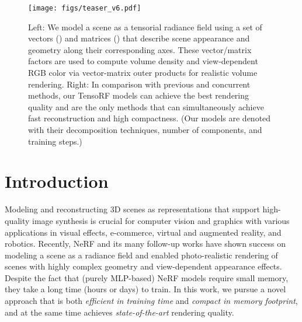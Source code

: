 \documentclass[runningheads]{llncs}
\begin{document}
\newcommand{\Tensor}{\mathcal{T}}
\newcommand{\Vector}{\mathbf{v}}
\newcommand{\Matrix}{\mathbf{M}}
\newcommand{\AppVec}{\mathbf{b}}
\newcommand{\AppMat}{\mathbf{B}}
\newcommand{\VectorPack}{\mathbf{V}}
\newcommand{\RRR}{\mathbb{R}}
\newcommand{\DimIJK}{I\times J\times K}
\newcommand{\DimCh}{P}


\newcommand{\OuterP}{\circ}
\newcommand{\ScalarP}{\ast}
\newcommand{\Pos}{\mathbf{x}}
\newcommand{\Dens}{\sigma}
\newcommand{\Rad}{c}
\newcommand{\Color}{C}
\newcommand{\Trans}{\tau}
\newcommand{\Step}{\Delta}
\newcommand{\Comp}{\mathcal{A}}
\newcommand{\Dir}{d}
\newcommand{\Grid}{\mathcal{G}}
\newcommand{\ShadFunc}{S}
\newcommand{\loss}{\mathcal{L}}

\begin{figure}[t]
    \texttt{[image: figs/teaser\_v6.pdf]}
    \vspace{-5mm}
    \caption{
    Left: We model a scene as a tensorial radiance field using a set of vectors () and matrices () that describe scene appearance and geometry along their corresponding axes. These vector/matrix factors are used to compute volume density  and view-dependent RGB color via vector-matrix outer products for realistic volume rendering.
    Right: In comparison with previous and concurrent methods, our TensoRF models can achieve the best rendering quality and are the only methods that can simultaneously achieve fast reconstruction and high compactness. (Our models are denoted with their decomposition techniques, number of components, and training steps.)
} \vspace{-5mm}
    \label{fig:teaser}
\end{figure}

\section{Introduction}

Modeling and reconstructing 3D scenes as representations that support high-quality image synthesis is crucial for computer vision and graphics with various applications in visual effects, e-commerce, virtual and augmented reality, and robotics.
Recently, NeRF \cite{mildenhall2020nerf} and its many follow-up works \cite{zhang2020nerf++,liu2020neural} have shown success on modeling a scene as a radiance field 
and enabled photo-realistic rendering of scenes with highly complex geometry and view-dependent appearance effects. Despite the fact that (purely MLP-based) NeRF models require small memory, they take a long time (hours or days) to train. In this work, we pursue a novel approach that is both \emph{efficient in training time} and \emph{compact in memory footprint}, and at the same time achieves \emph{state-of-the-art} rendering quality.
\end{document}
